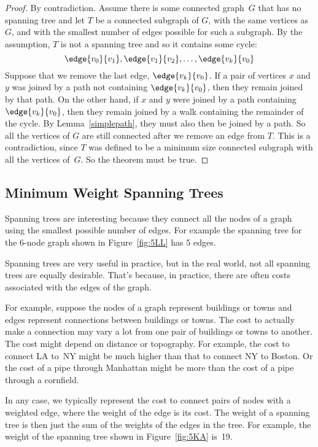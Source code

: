 \begin{proof}
By contradiction.  Assume there is some connected graph~$G$ that has
no spanning tree and let $T$ be a connected subgraph of $G$, with the
same vertices as $G$, and with the smallest number of edges possible
for such a subgraph.  By the assumption, $T$ is not a spanning tree
and so it contains some cycle:
\[
\edge{v_0}{v_1}, \edge{v_1}{v_2}, \dots, \edge{v_k}{v_0}
\]
Suppose that we remove the last edge, $\edge{v_k}{v_0}$.  If a pair
of vertices $x$ and $y$ was joined by a path not containing
$\edge{v_k}{v_0}$, then they remain joined by that path.  On the
other hand, if $x$ and $y$ were joined by a path containing
$\edge{v_k}{v_0}$, then they remain joined by a walk containing the
remainder of the cycle.  By Lemma~\ref{simplepath}, they must also
then be joined by a path.  So all the vertices of $G$ are still
connected after we remove an edge from $T$.  This is a contradiction,
since $T$ was defined to be a minimum size connected subgraph with
all the vertices of~$G$.  So the theorem must be true.
\end{proof}

\subsection{Minimum Weight Spanning Trees}

Spanning trees are interesting because they connect all the nodes of a
graph using the smallest possible number of edges.  For example the
spanning tree for the 6-node graph shown in Figure~\ref{fig:5LL} has 5
edges.

Spanning trees are very useful in practice, but in the real world, not
all spanning trees are equally desirable.  That's because, in
practice, there are often costs associated with the edges of the graph.

For example, suppose the nodes of a graph represent buildings or towns
and edges represent connections between buildings or towns.  The cost
to actually make a connection may vary a lot from one pair of
buildings or towns to another.  The cost might depend on distance or
topography.  For example, the cost to connect LA to~NY might be much
higher than that to connect NY to Boston.  Or the cost of a pipe
through Manhattan might be more than the cost of a pipe through a
cornfield.

In any case, we typically represent the cost to connect pairs of nodes
with a weighted edge, where the weight of the edge is its cost.  The
weight of a spanning tree is then just the sum of the weights of the
edges in the tree.  For example, the weight of the spanning tree shown
in Figure~\ref{fig:5KA} is~19.

